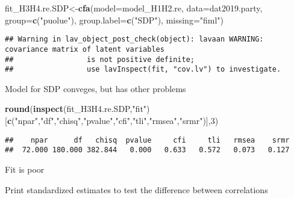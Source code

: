 \documentclass[
]{article}
\newenvironment{Shaded}{\begin{snugshade}}{\end{snugshade}}
\newcommand{\DataTypeTok}[1]{\textcolor[rgb]{0.13,0.29,0.53}{#1}}
\newcommand{\DecValTok}[1]{\textcolor[rgb]{0.00,0.00,0.81}{#1}}
\newcommand{\KeywordTok}[1]{\textcolor[rgb]{0.13,0.29,0.53}{\textbf{#1}}}
\newcommand{\NormalTok}[1]{#1}
\newcommand{\OperatorTok}[1]{\textcolor[rgb]{0.81,0.36,0.00}{\textbf{#1}}}
\newcommand{\StringTok}[1]{\textcolor[rgb]{0.31,0.60,0.02}{#1}}
\begin{document}
\begin{Shaded}
\begin{Highlighting}[]
\NormalTok{fit_H3H4.re.SDP<-}\KeywordTok{cfa}\NormalTok{(}\DataTypeTok{model=}\NormalTok{model_H1H2.re,}
                    \DataTypeTok{data=}\NormalTok{dat2019.party,}
                    \DataTypeTok{group=}\KeywordTok{c}\NormalTok{(}\StringTok{"puolue"}\NormalTok{),}
                    \DataTypeTok{group.label=}\KeywordTok{c}\NormalTok{(}\StringTok{"SDP"}\NormalTok{),}
                    \DataTypeTok{missing=}\StringTok{"fiml"}\NormalTok{)}
\end{Highlighting}
\end{Shaded}

\begin{verbatim}
## Warning in lav_object_post_check(object): lavaan WARNING: covariance matrix of latent variables
##                 is not positive definite;
##                 use lavInspect(fit, "cov.lv") to investigate.
\end{verbatim}

Model for SDP conveges, but has other problems

\begin{Shaded}
\begin{Highlighting}[]
\KeywordTok{round}\NormalTok{(}\KeywordTok{inspect}\NormalTok{(fit_H3H4.re.SDP,}\StringTok{"fit"}\NormalTok{)}
\NormalTok{      [}\KeywordTok{c}\NormalTok{(}\StringTok{"npar"}\NormalTok{,}\StringTok{"df"}\NormalTok{,}\StringTok{"chisq"}\NormalTok{,}\StringTok{"pvalue"}\NormalTok{,}\StringTok{"cfi"}\NormalTok{,}\StringTok{"tli"}\NormalTok{,}\StringTok{"rmsea"}\NormalTok{,}\StringTok{"srmr"}\NormalTok{)],}\DecValTok{3}\NormalTok{)}
\end{Highlighting}
\end{Shaded}

\begin{verbatim}
##    npar      df   chisq  pvalue     cfi     tli   rmsea    srmr 
##  72.000 180.000 382.844   0.000   0.633   0.572   0.073   0.127
\end{verbatim}

Fit is poor

Print standardized estimates to test the difference between correlations

\begin{Shaded}
\end{Shaded}
\end{document}
